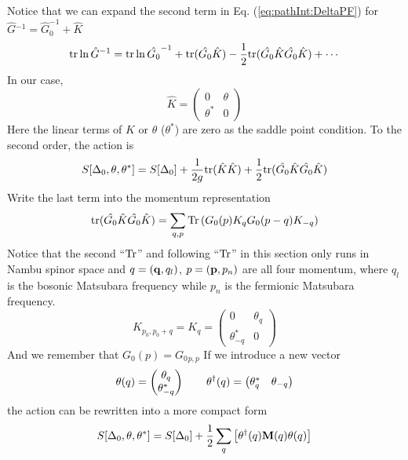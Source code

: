 Notice that we can expand the second term in Eq. (\ref{eq:pathInt:DeltaPF}) for $\hat{G}{}^{-1}=\hat{G}_{0}^{-1}+\hat{K}$
\begin{equation}\label{eq:pathInt:expand}
\text{tr}\ln \hat{G}^{-1}=\text{tr}\ln\hat{G_{0}}^{-1}+\text{tr}(\hat{G_{0}}\hat{K})-\frac{1}{2}\text{tr}(\hat{G_{0}}\hat{K}\hat{G_{0}}\hat{K})+\cdots
\end{equation}
In our case,
\begin{equation}
\hat{K}=\begin{pmatrix}
0&\theta\\
\theta^{*}&0
\end{pmatrix}
\end{equation}
Here the linear terms of $\hat{K}$ or $\theta$ ($\theta^{*}$) are zero as the saddle point condition.  To the second order, the action is 
\begin{equation}\label{eq:pathInt:DeltaActionGaussian}
S[\Delta_{0},\theta,\theta^{*}]=S[\Delta_{0}]+
	\frac{1}{2g}\text{tr}(\hat{K}\hat{K})+\frac{1}{2}\text{tr}(\hat{G_{0}}\hat{K}\hat{G_{0}}\hat{K})
\end{equation}
Write the last term into the momentum representation
\begin{equation}
\text{tr}(\hat{G_{0}}\hat{K}\hat{G_{0}}\hat{K})=\sum_{q,p}\text{Tr}\left(G_{0}({p})K_{q}G_{0}{}({p-q})K_{-q}\right)
\end{equation}
Notice that the second ``$\text{Tr}$'' and following ``$\text{Tr}$'' in this section only runs in Nambu spinor space and $q={(\mathbf{q},q_{l})}$, $p=(\mathbf{p},p_{n})$ are all four momentum, where $q_{l}$ is the bosonic Matsubara frequency while $p_{n}$ is the fermionic Matsubara frequency.
\begin{equation}
K_{p_{0},p_{0}+q}=K_{q}=\begin{pmatrix}
0&\theta_{q}\\
\theta^{*}_{-q}&0
\end{pmatrix}
\end{equation}
And we remember that $G_{0}(p)=G_{0}{}_{p,p}$
If we introduce  a new vector 
\begin{equation}
\theta{(q)}=\begin{pmatrix}\theta_{q}\\\theta^{*}_{-q}\end{pmatrix}\qquad
\theta^{\dagger}{(q)}=\begin{pmatrix}\theta^{*}_{q}&\theta_{-q}\end{pmatrix}
\end{equation}
the action can be rewritten into a more compact form
\begin{equation}
S[\Delta_{0},\theta,\theta^{*}]=S[\Delta_{0}]+\frac{1}{2}\sum_{q}\left[\theta^{\dagger}(q)\mathbf{M}(q)\theta(q)\right]
\end{equation}
